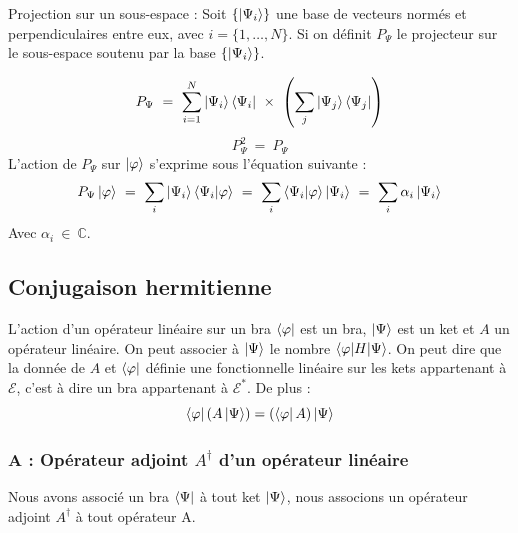 \documentclass[12pt,a4paper,titlepage]{book}
\begin{document}
Projection sur un sous-espace : Soit $\lbrace \ket{\Psi_i} \rbrace$ une base de vecteurs normés et perpendiculaires entre eux, avec $i = \lbrace 1, \ldots, N \rbrace$. Si on définit $P_{\Psi}$ le projecteur sur le sous-espace soutenu par la base $\lbrace \ket{\Psi_i} \rbrace$.

\begin{equation*}
P_{\Psi} ~=~ \sum\limits_{i=1}^{N} \ket{\Psi_i} \bra{\Psi_i} ~\times~ \left( \sum\limits_{j} \ket{\Psi_j} \bra{\Psi_j} \right)
\end{equation*}
\begin{equation*}
P_{\Psi}^2 ~=~ P_{\Psi}
\end{equation*}
L'action de $P_{\Psi}$ sur $\ket{\varphi}$ s'exprime sous l'équation suivante :\\
\begin{equation*}
P_{\Psi} \ket{\varphi} ~=~ \sum\limits_i \ket{\Psi_i} \braket{\Psi_i | \varphi} ~=~ \sum\limits_i \braket{\Psi_i | \varphi} \ket{\Psi_i} ~=~ \sum\limits_i \alpha_i \ket{\Psi_i}
\end{equation*}
Avec $\alpha_i ~\in~ \mathbb{C}$.

\subsection{Conjugaison hermitienne}

L'action d'un opérateur linéaire sur un bra $\bra{\varphi}$ est un bra, $\ket{\Psi}$ est un ket et $A$ un opérateur linéaire. On peut associer à $\ket{\Psi}$ le nombre $\braket{\varphi | H | \Psi}$. On peut dire que la donnée de $A$ et $\bra{\varphi}$ définie une fonctionnelle linéaire sur les kets appartenant à $\mathcal{E}$, c'est à dire un bra appartenant à $\mathcal{E}^*$. De plus :
\begin{equation*}
\bra{\varphi} \left( A \ket{\Psi}\right) = \left(\bra{\varphi} A \right) \ket{\Psi}
\end{equation*}

\subsubsection{A : Opérateur adjoint $A^{\dagger}$ d'un opérateur linéaire}
Nous avons associé un bra $\bra{\Psi}$ à tout ket $\ket{\Psi}$, nous associons un opérateur adjoint $A^{\dagger}$ à tout opérateur A.\\
\end{document}
